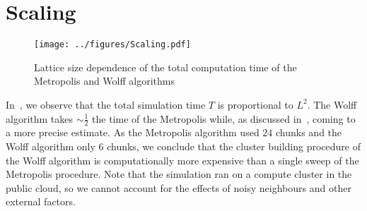 \section{Scaling}\label{sec:scaling}
	\begin{figure}[htbp]
		\centering
		\texttt{[image: ../figures/Scaling.pdf]}
		\caption[Correlation of the computational effort and the lattice size]{Lattice size dependence of the total computation time of the Metropolis and Wolff algorithms}
		\label{fig:scaling}
	\end{figure}
	In~, we observe that the total simulation time $T$ is proportional to $L^2$. The Wolff algorithm takes $\sim \frac{1}{2}$ the time of the Metropolis while, as discussed in~, coming to a more precise estimate. As the Metropolis algorithm used $24$ chunks and the Wolff algorithm only $6$ chunks, we conclude that the cluster building procedure of the Wolff algorithm is computationally more expensive than a single sweep of the Metropolis procedure. Note that the simulation ran on a compute cluster in the public cloud, so we cannot account for the effects of noisy neighbours and other external factors.